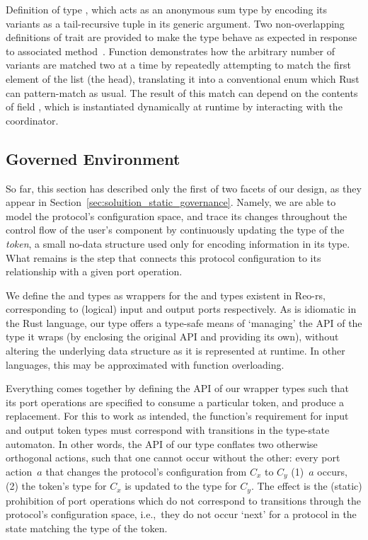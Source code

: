 \begin{listing}[h!]
	\centering
	\inputminted{rust}{state_set.rs}
	\caption[Rust implementation of an arbitrary state set.]{Definition of type , which acts as an anonymous sum type by encoding its variants as a tail-recursive tuple in its generic argument. Two non-overlapping definitions of trait  are provided to make the type behave as expected in response to associated method~. Function  demonstrates how the arbitrary number of variants are matched two at a time by repeatedly attempting to match the first element of the list (the head), translating it into a conventional  enum which Rust can pattern-match as usual. The result of this match can depend on the contents of field , which is instantiated dynamically at runtime by interacting with the coordinator.}
	\label{listing:state_set}
\end{listing}

\subsection{Governed Environment}
So far, this section has described only the first of two facets of our design, as they appear in Section~\ref{sec:soluition_static_governance}. Namely, we are able to model the protocol's configuration space, and trace its changes throughout the control flow of the user's component by continuously updating the type of the \textit{token}, a small no-data structure used only for encoding information in its type. What remains is the step that connects this protocol configuration to its relationship with a given port operation.

We define the  and  types as wrappers for the  and  types existent in Reo-rs, corresponding to (logical) input and output ports respectively. As is idiomatic in the Rust language, our  type offers a type-safe means of `managing' the API of the type it wraps (by enclosing the original API and providing its own), without altering the underlying data structure as it is represented at runtime. In other languages, this may be approximated with function overloading.

Everything comes together by defining the API of our wrapper types such that its port operations are specified to consume a particular token, and produce a replacement. For this to work as intended, the function's requirement for input and output token types must correspond with transitions in the type-state automaton. In other words, the API of our  type conflates two otherwise orthogonal actions, such that one cannot occur without the other: every port action~$a$ that changes the protocol's configuration from $C_x$ to $C_y$ (1)~$a$ occurs, (2) the token's type for $C_x$ is updated to the type for $C_y$. The effect is the (static) prohibition of port operations which do not correspond to transitions through the protocol's configuration space, i.e.,\ they do not occur `next' for a protocol in the state matching the type of the token. 


